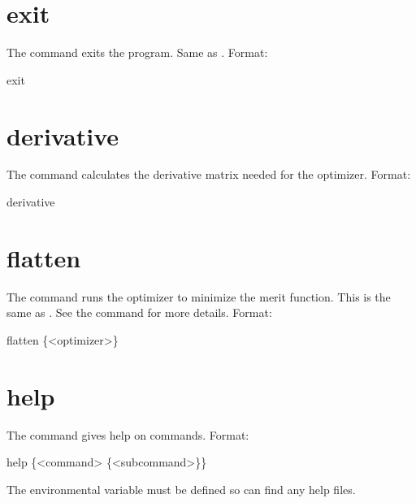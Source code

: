 \section{exit}
\label{s:exit}

The  command exits the program. Same as .  Format:
\begin{example}
  exit
\end{example}

\section{derivative}
\label{s:deriv}

The  command calculates the  derivative
matrix needed for the  optimizer.
Format:
\begin{example}
  derivative
\end{example}

\section{flatten}
\label{s:flatten}

The  command runs the optimizer to minimize the merit
function. This is the same as . See the  command for
more details.  Format:
\begin{example}
  flatten \{<optimizer>\}
\end{example}

\vskip 0.2in

\section{help}
\label{s:help}

The  command gives help on \tao commands. Format:
\begin{example}
  help \{<command> \{<subcommand>\}\}
\end{example}

\vskip 0.2in The environmental variable  must be defined
so \tao can find any help files.

